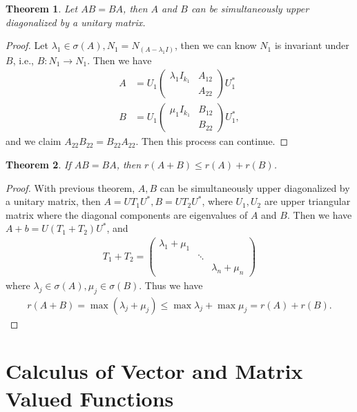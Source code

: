 \documentclass[11pt]{book}
\newtheorem{theorem}{Theorem}[chapter]
\theoremstyle{definition}
\numberwithin{equation}{chapter}
\begin{document}
\medskip

\begin{theorem}
Let $AB = BA$, then $A$ and $B$ can be simultaneously upper diagonalized by a unitary matrix.
\end{theorem}
\begin{proof}
Let $\lambda_1\in\sigma(A), N_1 = N_{(A - \lambda_1 I)}$, then we can know $N_1$ is invariant under $B$, i.e., $B:N_1\to N_1$. Then we have 
\begin{align*}
    A & = U_1 \begin{pmatrix}
    \lambda_1 I_{k_1} & A_{12} \\
     & A_{22}
    \end{pmatrix} U_1^* \\
    B & = U_1 \begin{pmatrix}
    \mu_1 I_{k_1} & B_{12} \\
     & B_{22}
    \end{pmatrix} U_1^*,
\end{align*}
and we claim $A_{22}B_{22} = B_{22}A_{22}$. Then this process can continue.
\end{proof}

\medskip

\begin{theorem}
If $AB = BA$, then $r(A+B)\leq r(A)+r(B)$.
\end{theorem}
\begin{proof}
With previous theorem, $A,B$ can be simultaneously upper diagonalized by a unitary matrix, then $A = UT_1U^*, B = UT_2U^*$, where $U_1, U_2$ are upper triangular matrix where the diagonal components are eigenvalues of $A$ and $B$. Then we have
$A+b = U(T_1+T_2)U^*$, and 
\begin{align*}
    T_1+T_2 = \begin{pmatrix}
    \lambda_1 + \mu_1 &  &  \\
     & \ddots &  \\
     &  & \lambda_n + \mu_n
    \end{pmatrix}
\end{align*}
where $\lambda_j\in\sigma(A), \mu_j\in\sigma(B)$. Thus we have
\begin{align*}
    r(A+B) = \max (\lambda_j + \mu_j) \leq \max \lambda_j + \max \mu_j = r(A)+r(B).
\end{align*}
\end{proof}

\medskip

\chapter{Calculus of Vector and Matrix Valued Functions}
\end{document}
